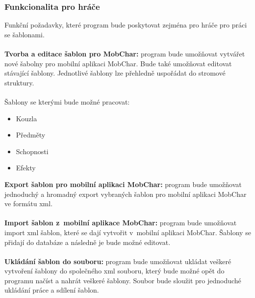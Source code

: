 \documentclass[thesis=B,czech]{resources/FITthesis}[2012/06/26]
\begin{document}
\subsubsection{Funkcionalita pro hráče}
Funkční požadavky, které program bude poskytovat zejména pro hráče pro práci se šablonami.\\
\\
\textbf{Tvorba a editace šablon pro MobChar:} program bude umožňovat vytvářet nové šabolny pro mobilní aplikaci MobChar. Bude také umožňovat editovat stávající šablony. Jednotlivé šablony lze přehledně uspořádat do stromové struktury.\\
\\
Šablony se kterými bude možné pracovat:
				\begin{itemize}
					\item Kouzla
					\item Předměty
					\item Schopnosti
					\item Efekty
				\end{itemize}
\textbf{Export šablon pro mobilní aplikaci MobChar:} program bude umožňovat jednoduchý a hromadný export vybraných šablon pro mobilní aplikaci MobChar ve formátu xml.\\
\\
\textbf{Import šablon z~mobilní aplikace MobChar:} program bude umožňovat import xml šablon, které se dají vytvořit v~mobilní aplikaci MobChar. Šablony se přidají do databáze a následně je bude možné editovat.\\
\\
\textbf{Ukládání šablon do souboru:} program bude umožňovat ukládat veškeré vytvoření šablony do společného xml souboru, který bude možné opět do programu načíst a nahrát veškeré šablony. Soubor bude sloužit pro jednoduché ukládání práce a sdílení šablon.
\end{document}
